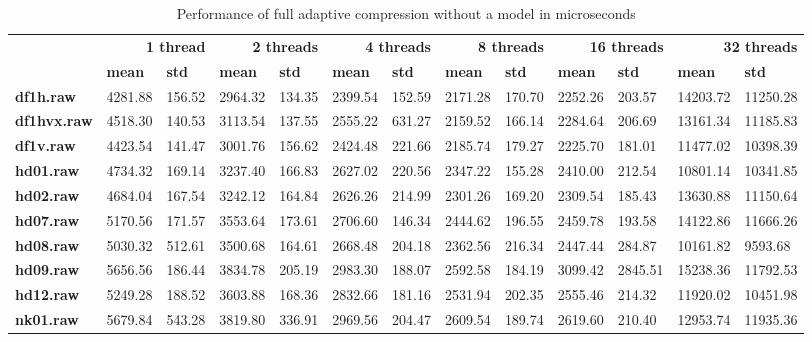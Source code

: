 \begin{table}[ht!]
\centering
\small
\begin{tabular}{l|ll|ll|ll|ll|ll|ll}
    & \multicolumn{2}{r|}{\textbf{1 thread}} & \multicolumn{2}{r|}{\textbf{2 threads}} & \multicolumn{2}{r|}{\textbf{4 threads}} & \multicolumn{2}{r|}{\textbf{8 threads}} & \multicolumn{2}{r|}{\textbf{16 threads}} & \multicolumn{2}{r}{\textbf{32 threads}} \\
    & \textbf{mean} & \textbf{std} & \textbf{mean} & \textbf{std} & \textbf{mean} & \textbf{std} & \textbf{mean} & \textbf{std} & \textbf{mean} & \textbf{std} & \textbf{mean} & \textbf{std} \\
\hline
    \textbf{df1h.raw} & 4281.88 & 156.52 & 2964.32 & 134.35 & 2399.54 & 152.59 & 2171.28 & 170.70 & 2252.26 & 203.57 & 14203.72 & 11250.28 \\
    \textbf{df1hvx.raw} & 4518.30 & 140.53 & 3113.54 & 137.55 & 2555.22 & 631.27 & 2159.52 & 166.14 & 2284.64 & 206.69 & 13161.34 & 11185.83 \\
    \textbf{df1v.raw} & 4423.54 & 141.47 & 3001.76 & 156.62 & 2424.48 & 221.66 & 2185.74 & 179.27 & 2225.70 & 181.01 & 11477.02 & 10398.39 \\
    \textbf{hd01.raw} & 4734.32 & 169.14 & 3237.40 & 166.83 & 2627.02 & 220.56 & 2347.22 & 155.28 & 2410.00 & 212.54 & 10801.14 & 10341.85 \\
    \textbf{hd02.raw} & 4684.04 & 167.54 & 3242.12 & 164.84 & 2626.26 & 214.99 & 2301.26 & 169.20 & 2309.54 & 185.43 & 13630.88 & 11150.64 \\
    \textbf{hd07.raw} & 5170.56 & 171.57 & 3553.64 & 173.61 & 2706.60 & 146.34 & 2444.62 & 196.55 & 2459.78 & 193.58 & 14122.86 & 11666.26 \\
    \textbf{hd08.raw} & 5030.32 & 512.61 & 3500.68 & 164.61 & 2668.48 & 204.18 & 2362.56 & 216.34 & 2447.44 & 284.87 & 10161.82 & 9593.68 \\
    \textbf{hd09.raw} & 5656.56 & 186.44 & 3834.78 & 205.19 & 2983.30 & 188.07 & 2592.58 & 184.19 & 3099.42 & 2845.51 & 15238.36 & 11792.53 \\
    \textbf{hd12.raw} & 5249.28 & 188.52 & 3603.88 & 168.36 & 2832.66 & 181.16 & 2531.94 & 202.35 & 2555.46 & 214.32 & 11920.02 & 10451.98 \\
    \textbf{nk01.raw} & 5679.84 & 543.28 & 3819.80 & 336.91 & 2969.56 & 204.47 & 2609.54 & 189.74 & 2619.60 & 210.40 & 12953.74 & 11935.36 \\
\end{tabular}
\caption{Performance of full adaptive compression without a model in microseconds}
\end{table}
